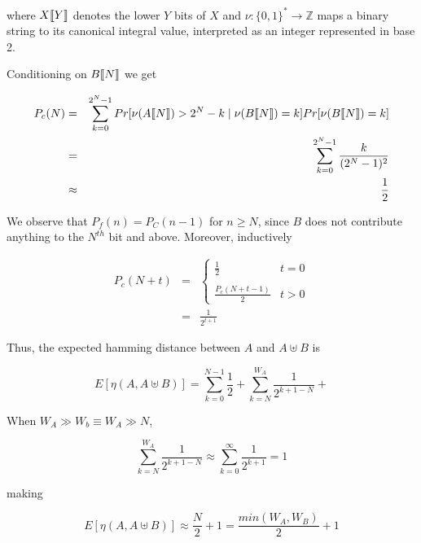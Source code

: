 where $X\llbracket Y \rrbracket $ denotes the lower $Y$ bits of $X$ and $\nu :
\{0, 1\}^* \to \mathbb{Z}$ maps a binary string to its canonical integral
value, interpreted as an integer represented in base 2.

Conditioning on $B\llbracket N \rrbracket $ we get

\begin{eqnarray*}
  \label{eq:approximation-before-N}
  P_c(N) & = & \displaystyle\sum\limits_{k=0}^{2^{N} - 1}
  Pr[\nu(A\sembrack{N}) > 2^N - k \mid \nu(B\sembrack{N}) = k]
  Pr[\nu(B\sembrack{N}) = k] \\
  & = & \displaystyle\sum\limits_{k=0}^{2^{N} - 1} \frac{k}{(2^N - 1)^2} \\
  & \approx & \frac{1}{2}
\end{eqnarray*}

We observe that $P_f(n) = P_C(n - 1)$ for $n \geq N$, since $B$ does
not contribute anything to the $N^{th}$ bit and above.  Moreover,
inductively

\begin{eqnarray*}
  P_c(N + t) & = &
  \begin{cases}
    \frac{1}{2} & t = 0 \\
    \\
    \frac{P_c(N + t - 1)}{2} & t > 0
  \end{cases} \\
  & = & \frac{1}{2^{t + 1}}
\end{eqnarray*}

Thus, the expected hamming distance between $A$ and $A \uplus B$ is

\begin{equation}
  \label{eq:no-assumptions}
  E[\eta(A, A \uplus B)] = \displaystyle\sum\limits_{k=0}^{N - 1} \frac{1}{2} + 
  \displaystyle\sum\limits_{k=N}^{W_A} \frac{1}{2^{k + 1 - N}} + 
\end{equation}

When $W_A \gg W_b \equiv W_A \gg N$, 

\begin{equation}
  \displaystyle\sum\limits_{k=N}^{W_A} \frac{1}{2^{k + 1 - N}} \approx
  \displaystyle\sum\limits_{k=0}^{\infty} \frac{1}{2^{k + 1}} = 1
\end{equation}

making

\begin{equation}
  E[\eta(A, A \uplus B)] \approx \frac{N}{2} + 1 = 
  \frac{min(W_A, W_B)}{2} + 1
\end{equation}

